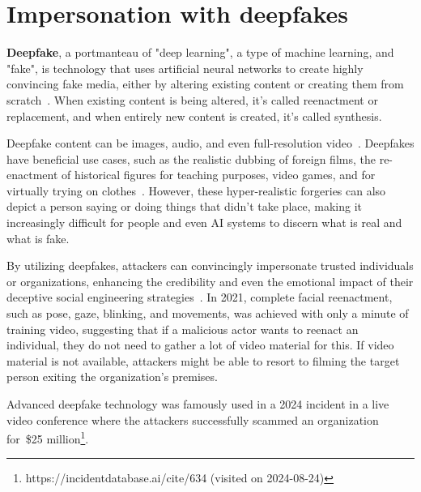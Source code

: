 \section{Impersonation with deepfakes}
\begin{comment}
\end{comment}

%
%
\textbf{Deepfake}, a portmanteau of "deep learning", a type of machine learning, and "fake", is technology that uses artificial neural networks to create highly convincing fake media, either by altering existing content or creating them from scratch~\citep{mirsky_Creation_Detection_Deepfakes_2021}. When existing content is being altered, it's called reenactment or replacement, and when entirely new content is created, it's called synthesis.

%
%
Deepfake content can be images, audio, and even full-resolution video~\citep{blauth_AI_Crime_Overview_Malicious_Use_Abuse_2022}. Deepfakes have beneficial use cases, such as the realistic dubbing of foreign films, the re-enactment of historical figures for teaching purposes, video games, and for virtually trying on clothes~\citep{mirsky_Creation_Detection_Deepfakes_2021}. However, these hyper-realistic forgeries can also depict a person saying or doing things that didn't take place, making it increasingly difficult for people and even AI systems to discern what is real and what is fake. 

%
%
By utilizing deepfakes, attackers can convincingly impersonate trusted individuals or organizations, enhancing the credibility and even the emotional impact of their deceptive social engineering strategies~\citep{mirsky_Creation_Detection_Deepfakes_2021}. In 2021, complete facial reenactment, such as pose, gaze, blinking, and movements, was achieved with only a minute of training video, suggesting that if a malicious actor wants to reenact an individual, they do not need to gather a lot of video material for this. If video material is not available, attackers might be able to resort to filming the target person exiting the organization's premises. 

Advanced deepfake technology was famously used in a 2024 incident in a live video conference where the attackers successfully scammed an organization for~\$25 million\footnote{https://incidentdatabase.ai/cite/634 (visited on 2024-08-24)}.%




